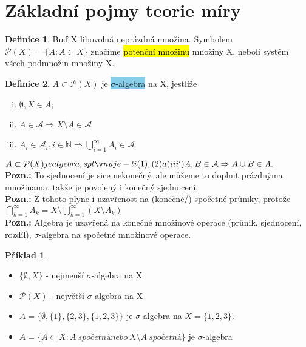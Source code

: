 \documentclass{article}
\DeclareRobustCommand{\hldef}[1]{{\sethlcolor{SkyBlue}\hl{#1}}}
\DeclareRobustCommand{\hldefmath}[1]{{\colorbox{SkyBlue}{#1}}}
\theoremstyle{definition}
\theoremstyle{definition}
\newtheorem*{pr}{Příklad}
\theoremstyle{definition}
\newtheorem*{definice}{Definice}
\begin{document}
\section{Základní pojmy teorie míry}
\begin{definice}
    Buď X libovolná neprázdná množina. Symbolem	\(\mathcal{P}(X) =  \{A :  A \subset	X\}\) značíme \hldef{potenční množinu}
    množiny X, neboli systém všech podmnožin množiny X.
\end{definice}
\begin{definice}
    \(A \subset \mathcal{P}(X)\) je  \hldefmath{\(\sigma\)-algebra} na X, jestliže
    \begin{enumerate}[(i)]
        \item \(\emptyset, X \in A\);
        \item \(A \in \mathcal{A} \Rightarrow X \setminus A \in \mathcal{A}\) 
        \item \(A_i \in \mathcal{A}_i, i \in \mathbb{N} \Rightarrow \bigcup_{i = 1}^{\infty}A_i \in \mathcal{A}\)
    \end{enumerate}
    \(A \subset \mathcal{P}(X) je algebra, splňuje-li (1), (2) a \\
    (iii') A, B \in \mathcal{A} \Rightarrow A \cup B \in A.\) \\
    \textbf{Pozn.:} To sjednocení je sice nekonečný, ale můžeme to doplnit prázdnýma množinama, takže
    je povolený i konečný sjednocení. \\
    \textbf{Pozn.:} Z tohoto plyne i uzavřenost na (konečné/) spočetné průniky, protože 
    \(\bigcap_{k = 1}^{\infty} A_k = X \setminus \bigcup_{k=1}^{\infty}(X \setminus A_k)\) \\  
    \textbf{Pozn.:} Algebra  je  uzavřená  na  konečné  množinové  operace  (průnik,  sjednocení, rozdíl),
     \(\sigma\)-algebra na spočetné množinové operace.
\end{definice}
\begin{pr}
    \begin{itemize}
        \item \(\{ \emptyset , X\}\) - nejmenší \(\sigma\)-algebra na X
        \item \(\mathcal{P}(X)\) - největší \(\sigma\)-algebra na X
        \item \(A = \{\emptyset, \{1\}, \{2, 3\}, \{1, 2, 3\}\}\) je \(\sigma\)-algebra na \(X = \{1, 2, 3\}\).
        \item \(A = \{ A \subset X: A \ spočetná nebo \ X \setminus A \ spočetná\}\) je \(\sigma\)-algebra
    \end{itemize}
\end{pr}
\end{document}
